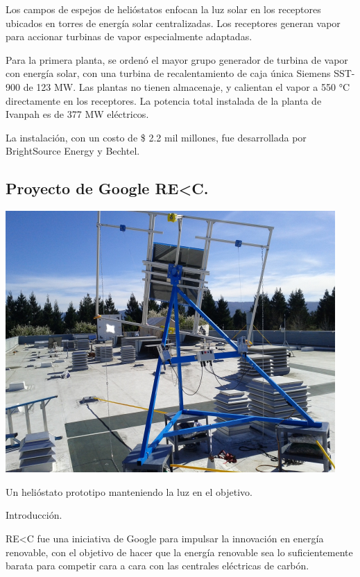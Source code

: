 \documentclass[12pt]{article}
\begin{document}
Los campos de espejos de helióstatos enfocan la luz solar en los receptores ubicados en torres de energía solar centralizadas. Los receptores generan vapor para accionar turbinas de vapor especialmente adaptadas.
 
Para la primera planta, se ordenó el mayor grupo generador de turbina de vapor con energía solar, con una turbina de recalentamiento de caja única Siemens SST-900 de 123 MW. Las plantas no tienen almacenaje, y calientan el vapor a 550 °C directamente en los receptores. La potencia total instalada de la planta de Ivanpah es de 377 MW eléctricos.
 
La instalación, con un costo de \$ 2.2 mil millones, fue desarrollada por BrightSource Energy y Bechtel. \cite{Wikipedia2WebSite}



\subsection{Proyecto de Google RE\textless C.}

\includegraphics[width=\textwidth]{HeliostatoGoogle.png}

Un helióstato prototipo manteniendo la luz en el objetivo. \cite{Wikipedia3WebSite}

Introducción.

RE\textless C fue una iniciativa de Google para impulsar la innovación en energía renovable, con el objetivo de hacer que la energía renovable sea lo suficientemente barata para competir cara a cara con las centrales eléctricas de carbón.
\end{document}

